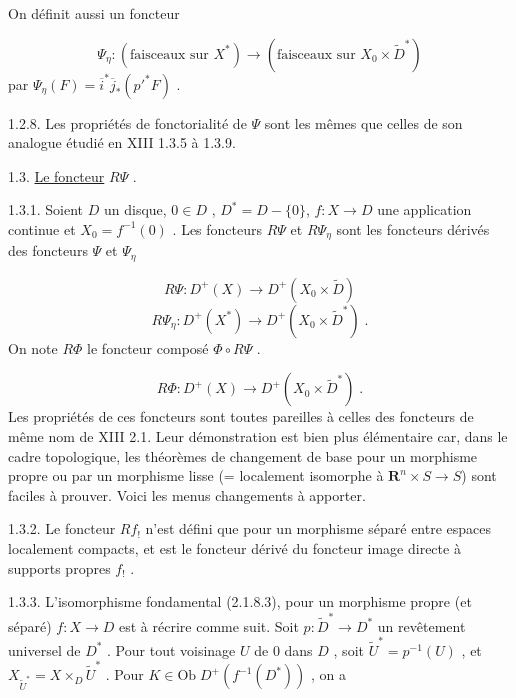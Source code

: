 On définit aussi un foncteur

\begin{equation*}
\Psi_\eta : (\mbox{faisceaux sur } X^* ) \longrightarrow (\mbox{faisceaux sur } X_0 \times \widetilde{D}^*)
\end{equation*}
par $\Psi_\eta(F) = \overline{i}^* \overline{j}_*({p'}^* F)$ .

1.2.8. Les propriétés de fonctorialité de $\Psi$ sont les mêmes que celles de son analogue étudié en XIII 1.3.5 à 1.3.9.




1.3. \underline{Le foncteur} $R\Psi$ .

1.3.1. Soient $D$ un disque, $0 \in D$ , $D^* = D-\{0\}$, $f: X \to D$ une application continue et $X_0 = f^{-1}(0)$ . Les foncteurs $R\Psi$ et $R\Psi_\eta$ sont les foncteurs dérivés des foncteurs $\Psi$ et $\Psi_\eta$

\begin{equation*}
R\Psi : D^+(X) \longrightarrow D^+(X_0 \times \widetilde{D})
\end{equation*}
\begin{equation*}
R\Psi_\eta : D^+(X^*) \longrightarrow D^+(X_0 \times \widetilde{D}^*) \; .
\end{equation*}
On note $R\Phi$ le foncteur composé $\Phi \circ R\Psi$ .

\begin{equation*}
R\Phi : D^+(X) \longrightarrow D^+(X_0 \times \widetilde{D}^*) \; .
\end{equation*}
Les propriétés de ces foncteurs sont toutes pareilles à celles des foncteurs de même nom de XIII 2.1. Leur démonstration est bien plus élémentaire car, dans le cadre topologique, les théorèmes de changement de base pour un morphisme propre ou par un morphisme lisse (= localement isomorphe à $\mathbf{R}^n \times S \to S$) sont faciles à prouver. Voici les menus changements à apporter.

1.3.2. Le foncteur $Rf_!$ n'est défini que pour un morphisme séparé entre espaces localement compacts, et est le foncteur dérivé du foncteur image directe à supports propres $f_!$ .

1.3.3. L'isomorphisme fondamental (2.1.8.3), pour un morphisme propre (et séparé) $f : X \to D$ est à récrire comme suit. Soit $p : \widetilde{D}^* \to D^*$ un revêtement universel de $D^*$ . Pour tout voisinage $U$ de $0$ dans $D$ , soit $\widetilde{U}^* = p^{-1}(U)$ , et $X_{\widetilde{U}^*} = X \times_D \widetilde{U}^*$ . Pour $K \in \mathrm{Ob}\; D^+(f^{-1}(D^*))$ , on a

